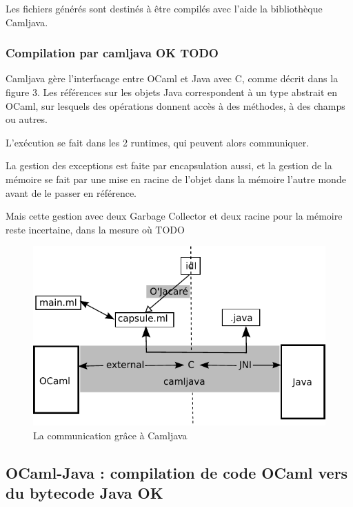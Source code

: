 \documentclass[a4paper, 11pt]{article}
\begin{document}
Les fichiers générés sont destinés à être compilés avec l'aide la bibliothèque
Camljava.

\newpage
\subsubsection{Compilation par camljava OK TODO}
Camljava gère l'interfacage entre OCaml et Java avec C, comme décrit
dans la figure 3.
Les références sur les objets Java correspondent à un type abstrait en
OCaml, sur lesquels des opérations donnent accès à des méthodes, à des
champs ou autres. 

L'exécution se fait dans les 2 runtimes, qui peuvent alors communiquer.

La gestion des exceptions est faite par encapsulation aussi, et la
gestion de la mémoire se fait par une mise en racine de l'objet dans la mémoire
l'autre monde avant de le passer en référence.

Mais cette gestion avec deux Garbage Collector et deux racine pour la mémoire reste incertaine, dans la mesure où TODO
\begin{figure}[h]
  \centering
  \includegraphics{schemaCamljava2.pdf}
  \caption{La communication grâce à Camljava}
\end{figure}










\subsection{OCaml-Java : compilation de code OCaml vers du bytecode Java OK}
\end{document}
